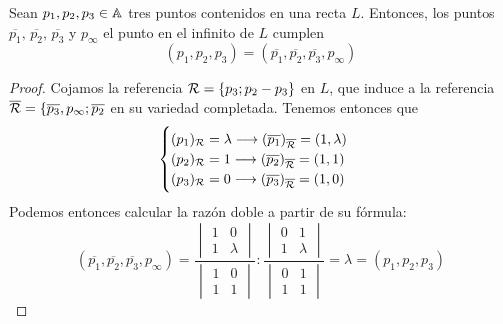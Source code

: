 \begin{prop}
  Sean $p_1, p_2, p_3 \in \mathbb{A}$ tres puntos contenidos en una recta $L$. Entonces,
  los puntos $\overline{p_1}, \, \overline{p_2}, \, \overline{p_3}$ 
  y $p_\infty$ el punto en el infinito de $L$ cumplen
  \[(p_1, p_2, p_3) = (\overline{p_1}, \overline{p_2}, \overline{p_3}, p_\infty)\]
\end{prop}

\begin{proof}
  Cojamos la referencia $\mathcal{R} = \{ p_3; p_2-p_3\}$ en $L$, que induce a la referencia
  $\overline{\mathcal{R}} = \{\overline{p_3}, p_\infty; \overline{p_2}$ en su variedad completada. 
  Tenemos entonces que 
  \[
    \begin{cases}
      (p_1)_{\mathcal{R}} = \lambda \longrightarrow (\overline{p_1})_{\overline{\mathcal{R}}} = (1, \lambda) \\
      (p_2)_{\mathcal{R}} = 1 \longrightarrow (\overline{p_2})_{\overline{\mathcal{R}}} = (1, 1) \\
      (p_3)_{\mathcal{R}} = 0 \longrightarrow (\overline{p_3})_{\overline{\mathcal{R}}} = (1, 0) 
    \end{cases}
  \]
  Podemos entonces calcular la razón doble a partir de su fórmula:
    \[
      (\overline{p_1}, \overline{p_2}, \overline{p_3}, p_\infty) = 
      \frac{
        \begin{vmatrix}
          1 & 0 \\ 1 & \lambda 
        \end{vmatrix}
      }
      {
        \begin{vmatrix}
        1 & 0 \\
        1 & 1
    \end{vmatrix}
  }
    :
    \frac{
        \begin{vmatrix}
          0 & 1 \\ 1 & \lambda 
        \end{vmatrix}
      }
      {
        \begin{vmatrix}
        0 & 1 \\
        1 & 1
    \end{vmatrix}
  }
  = \lambda = (p_1, p_2, p_3)
\]
\end{proof}

